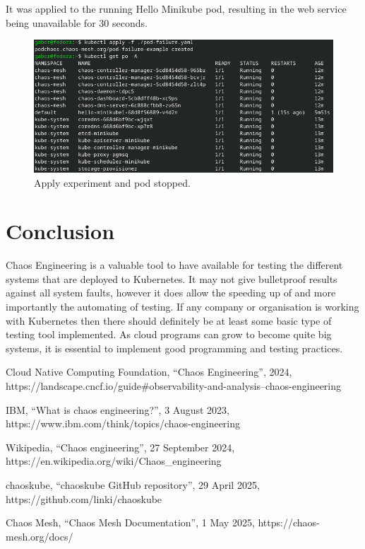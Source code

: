 \documentclass[conference]{IEEEtran}
\begin{document}
It was applied to the running Hello Minikube pod, resulting in the web service being unavailable for 30 seconds.

\begin{figure}
	\centering
	\includegraphics[width=1\linewidth]{hello_minikube_restarted}
	\caption{Apply experiment and pod stopped.}
	\label{fig:hellominikuberestarted}
\end{figure}

\section{Conclusion}

Chaos Engineering is a valuable tool to have available for testing the different systems that are deployed to Kubernetes. It may not give bulletproof results against all system faults, however it does allow the speeding up of and more importantly the automating of testing. If any company or organisation is working with Kubernetes then there should definitely be at least some basic type of testing tool implemented. As cloud programs can grow to become quite big systems, it is essential to implement good programming and testing practices.

\begin{thebibliography}{00}
 Cloud Native Computing Foundation,  ``Chaos Engineering'',  2024,  https://landscape.cncf.io/guide\#observability-and-analysis--chaos-engineering

 IBM, ``What is chaos engineering?'', 3 August 2023,  https://www.ibm.com/think/topics/chaos-engineering

 Wikipedia, ``Chaos engineering'', 27 September 2024, https://en.wikipedia.org/wiki/Chaos\_engineering

 chaoskube, ``chaoskube GitHub repository'', 29 April 2025,
https://github.com/linki/chaoskube

 Chaos Mesh, ``Chaos Mesh Documentation'', 1 May 2025, https://chaos-mesh.org/docs/

\end{thebibliography}
\end{document}
